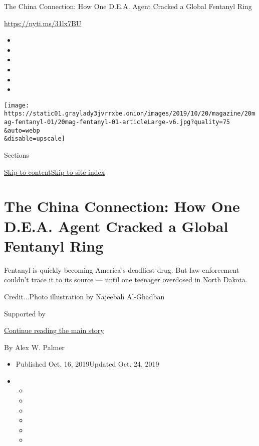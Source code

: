 The China Connection: How One D.E.A. Agent Cracked a Global Fentanyl
Ring

\url{https://nyti.ms/31lx7BU}

\begin{itemize}
\item
\item
\item
\item
\item
\item
\end{itemize}

\texttt{[image: https://static01.graylady3jvrrxbe.onion/images/2019/10/20/magazine/20mag-fentanyl-01/20mag-fentanyl-01-articleLarge-v6.jpg?quality=75\\\&auto=webp\\\&disable=upscale]}

Sections

\protect\hyperlink{site-content}{Skip to
content}\protect\hyperlink{site-index}{Skip to site index}

\hypertarget{the-china-connection-how-one-dea-agent-cracked-a-global-fentanyl-ring}{%
\section{The China Connection: How One D.E.A. Agent Cracked a Global
Fentanyl
Ring}\label{the-china-connection-how-one-dea-agent-cracked-a-global-fentanyl-ring}}

Fentanyl is quickly becoming America's deadliest drug. But law
enforcement couldn't trace it to its source --- until one teenager
overdosed in North Dakota.

Credit...Photo illustration by Najeebah Al-Ghadban

Supported by

\protect\hyperlink{after-sponsor}{Continue reading the main story}

By Alex W. Palmer

\begin{itemize}
\item
  Published Oct. 16, 2019Updated Oct. 24, 2019
\item
  \begin{itemize}
  \item
  \item
  \item
  \item
  \item
  \item
  \end{itemize}
\end{itemize}

